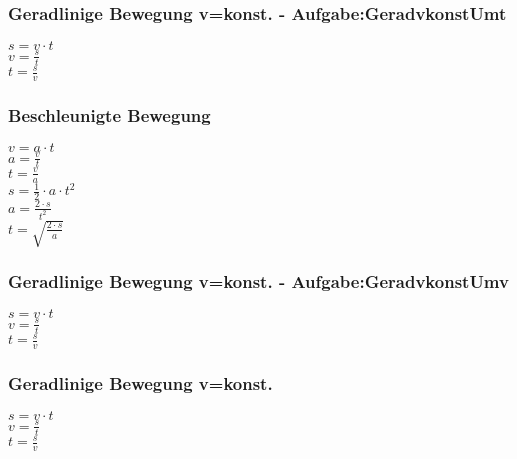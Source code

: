 \subsubsection{Geradlinige Bewegung v=konst. - Aufgabe:GeradvkonstUmt} 
\begin{minipage}{0.45\textwidth} 
$ s = v\cdot t $\\ 
$ v = \frac{s}{t} $\\ 
$ t = \frac{s}{v} $\\ 
\end{minipage} 
\begin{minipage}{0.45\textwidth} 
 
\end{minipage} 
\subsubsection{Beschleunigte Bewegung} 
\begin{minipage}{0.45\textwidth} 
$ v = a\cdot t $\\ 
$ a = \frac{v}{t} $\\ 
$ t = \frac{v}{a} $\\ 
$ s = \frac{1}{2}\cdot a\cdot t^{2} $\\ 
$ a = \frac{2\cdot s}{t^{2} } $\\ 
$ t = \sqrt{\frac{2\cdot s}{a}} $\\ 
\end{minipage} 
\begin{minipage}{0.45\textwidth} 
 
\end{minipage} 
\subsubsection{Geradlinige Bewegung v=konst. - Aufgabe:GeradvkonstUmv} 
\begin{minipage}{0.45\textwidth} 
$ s = v\cdot t $\\ 
$ v = \frac{s}{t} $\\ 
$ t = \frac{s}{v} $\\ 
\end{minipage} 
\begin{minipage}{0.45\textwidth} 
 
\end{minipage} 
\subsubsection{Geradlinige Bewegung v=konst.} 
\begin{minipage}{0.45\textwidth} 
$ s = v\cdot t $\\ 
$ v = \frac{s}{t} $\\ 
$ t = \frac{s}{v} $\\ 
\end{minipage} 
\begin{minipage}{0.45\textwidth} 
 
\end{minipage} 
